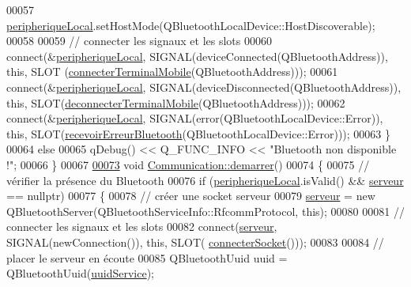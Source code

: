 \begin{DoxyCode}
00057         \hyperlink{class_communication_a2d643d199169dfe1d258df54d3ee5728}{peripheriqueLocal}.setHostMode(QBluetoothLocalDevice::HostDiscoverable);
00058 
00059         \textcolor{comment}{// connecter les signaux et les slots}
00060         connect(&\hyperlink{class_communication_a2d643d199169dfe1d258df54d3ee5728}{peripheriqueLocal}, SIGNAL(deviceConnected(QBluetoothAddress)), \textcolor{keyword}{this}, SLOT
      (\hyperlink{class_communication_a9640339b93f4a99f80426b7345615037}{connecterTerminalMobile}(QBluetoothAddress)));
00061         connect(&\hyperlink{class_communication_a2d643d199169dfe1d258df54d3ee5728}{peripheriqueLocal}, SIGNAL(deviceDisconnected(QBluetoothAddress)), \textcolor{keyword}{this}, 
      SLOT(\hyperlink{class_communication_aeeb47bc3c4d7419fefb737168638442e}{deconnecterTerminalMobile}(QBluetoothAddress)));
00062         connect(&\hyperlink{class_communication_a2d643d199169dfe1d258df54d3ee5728}{peripheriqueLocal}, SIGNAL(error(QBluetoothLocalDevice::Error)), \textcolor{keyword}{this}, 
      SLOT(\hyperlink{class_communication_adbbab5630096d6374c4d7e52508b8a37}{recevoirErreurBluetooth}(QBluetoothLocalDevice::Error)));
00063     \}
00064     \textcolor{keywordflow}{else}
00065         qDebug() << Q\_FUNC\_INFO << \textcolor{stringliteral}{"Bluetooth non disponible !"};
00066 \}
00067 
\hyperlink{class_communication_af29ea9a1c2ce29436f2331c322f6ebbf}{00073} \textcolor{keywordtype}{void} \hyperlink{class_communication_af29ea9a1c2ce29436f2331c322f6ebbf}{Communication::demarrer}()
00074 \{
00075     \textcolor{comment}{// vérifier la présence du Bluetooth}
00076     \textcolor{keywordflow}{if} (\hyperlink{class_communication_a2d643d199169dfe1d258df54d3ee5728}{peripheriqueLocal}.isValid() && \hyperlink{class_communication_a6384747297d6efa9e8fd2fc79ed0c269}{serveur} == \textcolor{keyword}{nullptr})
00077     \{
00078         \textcolor{comment}{// créer une socket serveur}
00079         \hyperlink{class_communication_a6384747297d6efa9e8fd2fc79ed0c269}{serveur} = \textcolor{keyword}{new} QBluetoothServer(QBluetoothServiceInfo::RfcommProtocol, \textcolor{keyword}{this});
00080 
00081         \textcolor{comment}{// connecter les signaux et les slots}
00082         connect(\hyperlink{class_communication_a6384747297d6efa9e8fd2fc79ed0c269}{serveur}, SIGNAL(newConnection()), \textcolor{keyword}{this}, SLOT(
      \hyperlink{class_communication_a1ef7e4107d98346290f19f76d7eecf32}{connecterSocket}()));
00083 
00084         \textcolor{comment}{// placer le serveur en écoute}
00085         QBluetoothUuid uuid = QBluetoothUuid(\hyperlink{_communication_8h_a6f285f3a7cee5c6573729d7e6b99dbf4}{uuidService});

\end{DoxyCode}
